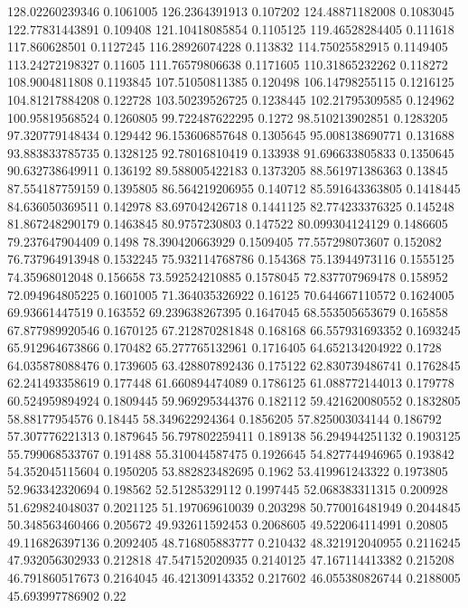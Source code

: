 128.02260239346 0.1061005
126.2364391913 0.107202
124.48871182008 0.1083045
122.77831443891 0.109408
121.10418085854 0.1105125
119.46528284405 0.111618
117.860628501 0.1127245
116.28926074228 0.113832
114.75025582915 0.1149405
113.24272198327 0.11605
111.76579806638 0.1171605
110.31865232262 0.118272
108.9004811808 0.1193845
107.51050811385 0.120498
106.14798255115 0.1216125
104.81217884208 0.122728
103.50239526725 0.1238445
102.21795309585 0.124962
100.95819568524 0.1260805
99.722487622295 0.1272
98.510213902851 0.1283205
97.320779148434 0.129442
96.153606857648 0.1305645
95.008138690771 0.131688
93.883833785735 0.1328125
92.78016810419 0.133938
91.696633805833 0.1350645
90.632738649911 0.136192
89.588005422183 0.1373205
88.561971386363 0.13845
87.554187759159 0.1395805
86.564219206955 0.140712
85.591643363805 0.1418445
84.636050369511 0.142978
83.697042426718 0.1441125
82.774233376325 0.145248
81.867248290179 0.1463845
80.9757230803 0.147522
80.099304124129 0.1486605
79.237647904409 0.1498
78.390420663929 0.1509405
77.557298073607 0.152082
76.737964913948 0.1532245
75.932114768786 0.154368
75.13944973116 0.1555125
74.35968012048 0.156658
73.592524210885 0.1578045
72.837707969478 0.158952
72.094964805225 0.1601005
71.364035326922 0.16125
70.644667110572 0.1624005
69.93661447519 0.163552
69.239638267395 0.1647045
68.553505653679 0.165858
67.877989920546 0.1670125
67.212870281848 0.168168
66.557931693352 0.1693245
65.912964673866 0.170482
65.277765132961 0.1716405
64.652134204922 0.1728
64.035878088476 0.1739605
63.428807892436 0.175122
62.830739486741 0.1762845
62.241493358619 0.177448
61.660894474089 0.1786125
61.088772144013 0.179778
60.524959894924 0.1809445
59.969295344376 0.182112
59.421620080552 0.1832805
58.88177954576 0.18445
58.349622924364 0.1856205
57.825003034144 0.186792
57.307776221313 0.1879645
56.797802259411 0.189138
56.294944251132 0.1903125
55.799068533767 0.191488
55.310044587475 0.1926645
54.827744946965 0.193842
54.352045115604 0.1950205
53.882823482695 0.1962
53.419961243322 0.1973805
52.963342320694 0.198562
52.51285329112 0.1997445
52.068383311315 0.200928
51.629824048037 0.2021125
51.197069610039 0.203298
50.770016481949 0.2044845
50.348563460466 0.205672
49.932611592453 0.2068605
49.522064114991 0.20805
49.116826397136 0.2092405
48.716805883777 0.210432
48.321912040955 0.2116245
47.932056302933 0.212818
47.547152020935 0.2140125
47.167114413382 0.215208
46.791860517673 0.2164045
46.421309143352 0.217602
46.055380826744 0.2188005
45.693997786902 0.22
